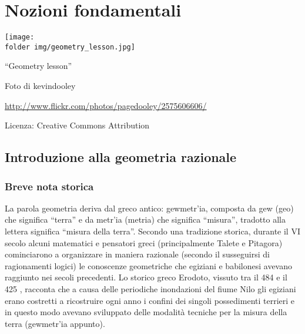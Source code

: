 
\chapter{Nozioni fondamentali}
\label{chap:nozioni_fondamentali}

\texttt{[image: \\folder img/geometry\_lesson.jpg]}
  \begin{center}
    {\large ``Geometry lesson''}\par
    Foto di kevindooley\par
    \url{http://www.flickr.com/photos/pagedooley/2575606606/}\par
    Licenza: Creative Commons Attribution\par
  \end{center}
\newpage

\section{Introduzione alla geometria 
razionale}\label{sect:intro_geometria_razionale}
\subsection{Breve nota storica}
La parola geometria deriva dal greco antico: \textgreek{gewmetr'ia}, 
composta da \textgreek{gew} (geo) che significa ``terra'' e da 
\textgreek{metr'ia} (metria) che significa ``misura'', tradotto alla 
lettera significa ``misura della terra''. Secondo una tradizione 
storica, durante il VI secolo \aC{} alcuni matematici e pensatori 
greci (principalmente Talete e Pitagora) cominciarono a organizzare 
in maniera razionale (secondo il susseguirsi di ragionamenti logici) 
le conoscenze geometriche che egiziani e babilonesi avevano raggiunto 
nei secoli precedenti. Lo storico greco Erodoto, vissuto tra il 484 
\aC{} e il 425 \aC, racconta che a causa delle periodiche inondazioni 
del fiume Nilo gli egiziani erano costretti a ricostruire ogni anno i 
confini dei singoli possedimenti terrieri e in questo modo avevano 
sviluppato delle modalità tecniche per la misura della terra 
(\textgreek{gewmetr'ia} appunto).

